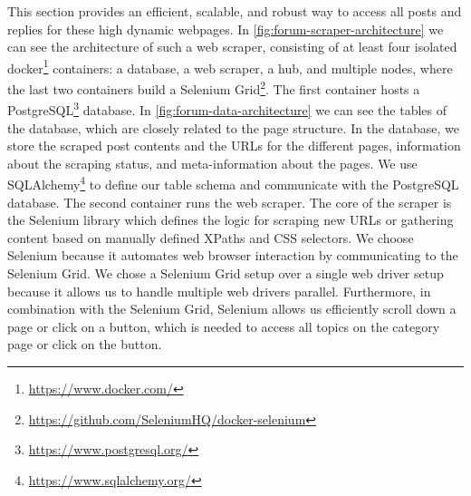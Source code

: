 This section provides an efficient, scalable, and robust way to access all posts and replies for these high dynamic webpages.
In \autoref{fig:forum-scraper-architecture} we can see the architecture of such a web scraper, consisting of at least four isolated docker\footnote{\url{https://www.docker.com/}} containers: a database, a web scraper, a hub, and multiple nodes, where the last two containers build a Selenium Grid\footnote{\url{https://github.com/SeleniumHQ/docker-selenium}}.
The first container hosts a PostgreSQL\footnote{\url{https://www.postgresql.org/}} database.
In \autoref{fig:forum-data-architecture} we can see the tables of the database, which are closely related to the page structure.
In the database, we store the scraped post contents and the \ac{URL}s for the different pages, information about the scraping status, and meta-information about the pages.
We use SQLAlchemy\footnote{\url{https://www.sqlalchemy.org/}}  to define our table schema and communicate with the PostgreSQL database.
The second container runs the web scraper.
The core of the scraper is the Selenium library which defines the logic for scraping new URLs or gathering content based on manually defined XPaths and CSS selectors.
We choose Selenium because it automates web browser interaction by communicating to the Selenium Grid.
We chose a Selenium Grid setup over a single web driver setup because it allows us to handle multiple web drivers parallel.
Furthermore, in combination with the Selenium Grid, Selenium allows us efficiently scroll down a page or click on a button, which is needed to access all topics on the category page or click on the  button.

